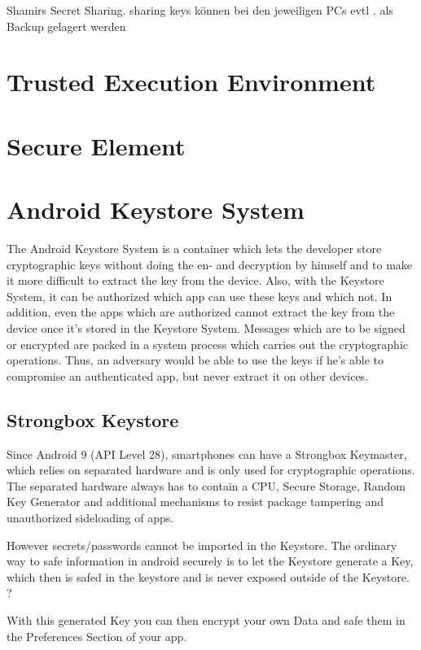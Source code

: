 \documentclass[12pt,oneside,a4paper,parskip]{scrbook}
\begin{document}
Shamirs Secret Sharing. sharing keys können bei den jeweiligen PCs evtl . als Backup gelagert werden

\section{Trusted Execution Environment}

\section{Secure Element}

\section{Android Keystore System}

The Android Keystore System is a container which lets the developer store cryptographic keys without doing the en- and decryption by himself and to make it more difficult to extract the key from the device. Also, with the Keystore System, it can be authorized which app can use these keys and which not. In addition, even the apps which are authorized cannot extract the key from the device once it's stored in the Keystore System. Messages which are to be signed or encrypted are packed in a system process which carries out the cryptographic operations. Thus, an adversary would be able to use the keys if he's able to compromise an authenticated app, but never extract it on other devices.

\subsection{Strongbox Keystore}

Since Android 9 (API Level 28), smartphones can have a Strongbox Keymaster, which relies on separated hardware and is only used for cryptographic operations.
The separated hardware always has to contain a CPU, Secure Storage, Random Key Generator and additional mechanisms to resist package tampering and unauthorized sideloading of apps.

However secrets/passwords cannot be imported in the Keystore. The ordinary way to safe information in android securely is to let the Keystore generate a Key, which then 
is safed in the keystore and is never exposed outside of the Keystore. ? 

With this generated Key you can then encrypt your own Data and safe them in the Preferences Section of your app.
\end{document}
